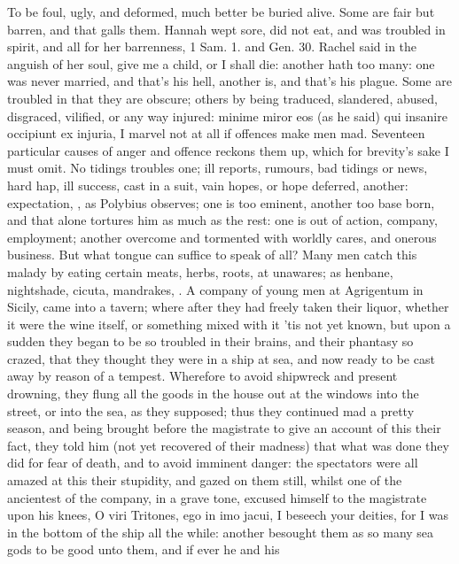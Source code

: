 {{To be foul, ugly, and deformed, much better be buried alive. Some are
fair but barren, and that galls them. Hannah wept sore, did not eat,
and was troubled in spirit, and all for her barrenness, 1 Sam. 1. and
Gen. 30. Rachel said in the anguish of her soul, give me a child, or I
shall die: another hath too many: one was never married, and that's his
hell, another is, and that's his plague. Some are troubled in that they
are obscure; others by being traduced, slandered, abused, disgraced,
vilified, or any way injured: minime miror eos (as he said) qui
insanire occipiunt ex injuria, I marvel not at all if offences make men
mad. Seventeen particular causes of anger and offence \Aristotle reckons
them up, which for brevity's sake I must omit. No tidings troubles one;
ill reports, rumours, bad tidings or news, hard hap, ill success, cast
in a suit, vain hopes, or hope deferred, another: expectation, , as Polybius
observes; one is too eminent, another too base born, and that alone
tortures him as much as the rest: one is out of action, company,
employment; another overcome and tormented with worldly cares, and
onerous business. But what tongue can suffice to speak of all?
Many men catch this malady by eating certain meats, herbs, roots, at
unawares; as henbane, nightshade, cicuta, mandrakes, \etc{}. A
company of young men at Agrigentum in Sicily, came into a tavern; where
after they had freely taken their liquor, whether it were the wine
itself, or something mixed with it 'tis not yet known, but upon a
sudden they began to be so troubled in their brains, and their phantasy
so crazed, that they thought they were in a ship at sea, and now ready
to be cast away by reason of a tempest. Wherefore to avoid shipwreck
and present drowning, they flung all the goods in the house out at the
windows into the street, or into the sea, as they supposed; thus they
continued mad a pretty season, and being brought before the magistrate
to give an account of this their fact, they told him (not yet recovered
of their madness) that what was done they did for fear of death, and to
avoid imminent danger: the spectators were all amazed at this their
stupidity, and gazed on them still, whilst one of the ancientest of the
company, in a grave tone, excused himself to the magistrate upon his
knees, O viri Tritones, ego in imo jacui, I beseech your deities, \etc{}
for I was in the bottom of the ship all the while: another besought
them as so many sea gods to be good unto them, and if ever he and his
}}
